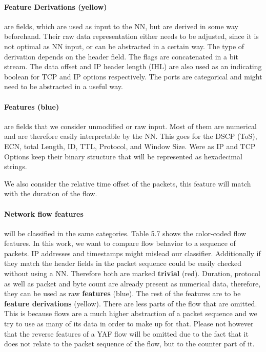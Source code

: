 \documentclass[
	ngerman,
	ruledheaders=section,%
	class=report,%
	thesis={type=bachelor},%
	accentcolor=9c,%
	custommargins=true,%
	marginpar=false,%
	parskip=half-,%
	fontsize=11pt,%
]{tudapub}
\begin{document}
\paragraph{\colorbox{derivation}{\textbf{Feature Derivations} (yellow)}} are fields, which are used as input to the NN,
but are derived in some way beforehand.
Their raw data representation either needs to be adjusted, since it is not optimal as NN input, or can be abstracted in a certain way.
The type of derivation depends on the header field.
The flags are concatenated in a bit stream.
The data offset and IP header length (IHL) are also used as an indicating boolean for TCP and IP options respectively.
The ports are categorical and might need to be abstracted in a useful way.

\paragraph{\colorbox{feature}{\textbf{Features} (blue)}} are fields that we consider unmodified or raw input.
Most of them are numerical and are therefore easily interpretable by the NN.
This goes for the DSCP (ToS), ECN, total Length, ID, TTL, Protocol, and Window Size.
Were as IP and TCP Options keep their binary structure that will be represented as hexadecimal strings.

We also consider the relative time offset of the packets, this feature will match with the duration of the flow.

\paragraph{Network flow features} will be classified in the same categories.
Table 5.7 shows the color-coded flow features.
In this work, we want to compare flow behavior to a sequence of packets.
IP addresses and timestamps might mislead our classifier.
Additionally if they match the header fields in the packet sequence could be easily checked without using a NN.
Therefore both are marked \colorbox{trivial}{\textbf{trivial} (red)}.
Duration, protocol as well as packet and byte count are already present as numerical data, therefore, they can be used as raw \colorbox{feature}{\textbf{features} (blue)}.
The rest of the features are to be \colorbox{derivation}{\textbf{feature derivations} (yellow)}.
There are less parts of the flow that are omitted.
This is because flows are a much higher abstraction of a packet sequence and we try to use as many of its data in order to make up for that.
Please not however that the reverse features of a YAF flow will be omitted due to the fact that it does not relate to the packet sequence of the flow, but to the counter part of it.
\end{document}
